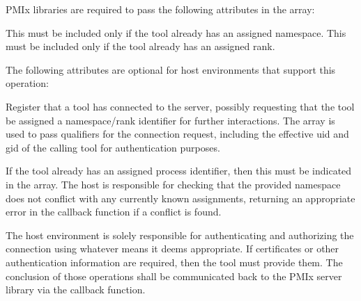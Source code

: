 \begin{arglist}
\end{arglist}

\reqattrstart
\ac{PMIx} libraries are required to pass the following attributes in the  array:

This must be included only if the tool already has an assigned namespace.
\pasteAttributeItemEnd{}
This must be included only if the tool already has an assigned rank.
\pasteAttributeItemEnd{}

\reqattrend


\optattrstart
The following attributes are optional for host environments that support this operation:


\optattrend

\descr

Register that a tool has connected to the server, possibly requesting that the
tool be assigned a namespace/rank identifier for further interactions.
The  array is used to pass qualifiers for the
connection request, including the effective uid and gid of the calling tool
for authentication purposes.

If the tool already has an assigned process identifier, then this must be
indicated in the  array. The host is responsible for checking
that the provided namespace does not conflict with any currently known
assignments, returning an appropriate error in the callback function if a conflict is found.

The host environment is solely responsible for authenticating and authorizing
the connection using whatever means it deems appropriate. If certificates or
other authentication information are required, then the tool must provide them.
The conclusion of those operations shall be communicated back to the \ac{PMIx}
server library via the callback function.

